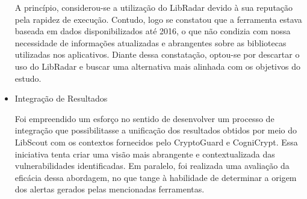\begin{itemize}
A princípio, considerou-se a utilização do LibRadar devido à sua reputação pela rapidez de execução. Contudo, logo se constatou que a ferramenta estava baseada em dados disponibilizados até 2016, o que não condizia com nossa necessidade de informações atualizadas e abrangentes sobre as bibliotecas utilizadas nos aplicativos. Diante dessa constatação, optou-se por descartar o uso do LibRadar e buscar uma alternativa mais alinhada com os objetivos do estudo.

\item{Integração de Resultados}

Foi empreendido um esforço no sentido de desenvolver um processo de integração que possibilitasse a unificação dos resultados obtidos por meio do LibScout com os contextos fornecidos pelo CryptoGuard e CogniCrypt. Essa iniciativa tenta criar uma visão mais abrangente e contextualizada das vulnerabilidades identificadas. Em paralelo, foi realizada uma avaliação da eficácia dessa abordagem, no que tange à habilidade de determinar a origem dos alertas gerados pelas mencionadas ferramentas.

\end{itemize}





